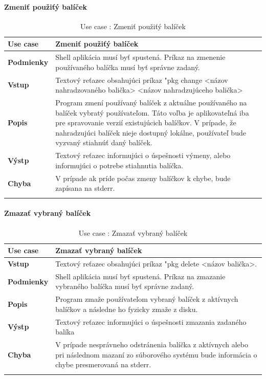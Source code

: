 \paragraph{Zmeniť  použiťý balíček}
\begin{center}
	\begin{longtable}{|p{2.5cm}|p{14cm}|}
		
			\hline
			\textbf{Use case} & Zmeniť  použiťý balíček \\ 
			\hline
			\textbf{Podmienky} & Shell aplikácia musí byť spustená. Príkaz na zmenenie používaného balíčka musí byť správne zadaný.\\ 
			\hline
			\textbf{Vstup} & Textový reťazec obsahujúci príkaz "pkg change <názov nahradzovaného balička> <názov nahradzujúceho balička>\\
			\hline
			\textbf{Popis} & Program zmení používaný balíček z aktuálne používaného na balíček vybratý používateľom. Táto voľba je aplikovateľná iba pre spravovanie verzií existujúcich balíčkov. V prípade, že nahradzujúci balíček nieje dostupný lokálne, používateľ bude vyzvaný stiahnúť daný balíček.\\ 
			\hline
			\textbf{Výstp} & Textový reťazec informujúci o úspešnosti výmeny, alebo informujúci o potrebe stiahnutia balíčka.\\
			\hline
			\textbf{Chyba} & V prípade ak príde počas zmeny balíčkov k chybe, bude zapísana na stderr.\\
			\hline
		\caption{Use case : Zmeniť  použiťý balíček}
		\label{table:1}
		
	\end{longtable}
\end{center}

\paragraph{Zmazať vybraný balíček}
\begin{center}
	\begin{longtable}{|p{2.5cm}|p{14cm}|}
		
			\hline
			\textbf{Use case} & Zmazať vybraný balíček \\ 
			\hline
			\textbf{Vstup} & Textový reťazec obsahujúci príkaz "pkg delete <názov balička>.\\
			\hline
			\textbf{Podmienky} & Shell aplikácia musí byť spustená. Príkaz na zmazanie vybraného balíčka musí byť správne zadaný.\\ 
			\hline
			\textbf{Popis} & Program zmaže používateľom vybraný balíček z aktívnych balíčkov a následne ho fyzicky zmaže z disku. \\
			\hline

			\textbf{Výstp} & Textový reťazec informujúci o úspešnosti zmazania zadaného balíka\\
			\hline
			\textbf{Chyba} & V prípade nesprávneho odstránenia balíčka z aktívnych alebo pri následnom mazaní zo súborového systému bude informácia o chybe presmerovaná na stderr.\\
			\hline
		\caption{Use case : Zmazať vybraný balíček}
		\label{table:1}
		
	\end{longtable}
\end{center}
